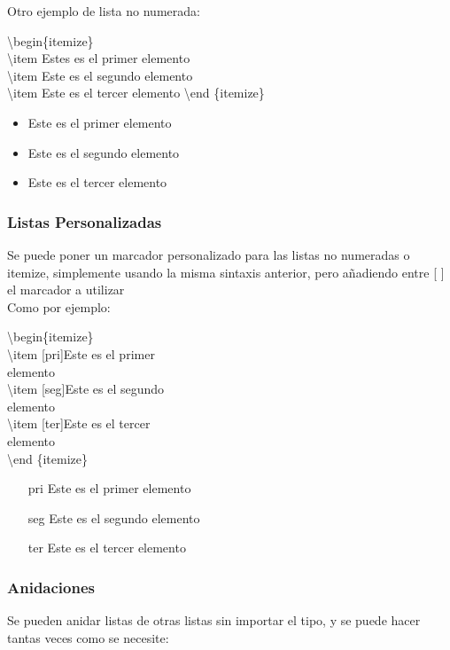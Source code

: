\documentclass{article}
\begin{document}
Otro ejemplo de lista no numerada:

\begin{multicols}{2} 
\noindent
\textbackslash begin\{itemize\}\\	
\textbackslash item Estes es el primer elemento\\
\textbackslash item Este es el segundo elemento\\
\textbackslash item Este es el tercer elemento
\textbackslash end \{itemize\}
\columnbreak
\begin{itemize}
\item Este es el primer elemento
\item Este es el segundo elemento
\item Este es el tercer elemento
\end{itemize}
\end{multicols}

\subsubsection{Listas Personalizadas}
Se puede poner un marcador personalizado para las listas no numeradas o itemize, simplemente usando la misma sintaxis anterior, pero a\~nadiendo entre [ ] el marcador a utilizar\\
Como por ejemplo:\\

\begin{multicols}{2} 
\noindent
\textbackslash begin\{itemize\}\\	
\textbackslash item [pri]Este es el primer\\
elemento\\
\textbackslash item [seg]Este es el segundo\\ 
elemento\\
\textbackslash item [ter]Este es el tercer\\ 
elemento\\
\textbackslash end \{itemize\}
\columnbreak
\begin{itemize}
\item[pri]Este es el primer elemento
\item[seg]Este es el segundo elemento
\item[ter]Este es el tercer elemento
\end{itemize}
\end{multicols}

\newpage
\subsubsection{Anidaciones}
Se pueden anidar listas de otras listas sin importar el tipo, y se puede hacer tantas veces como se necesite:
\end{document}
